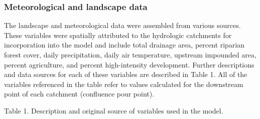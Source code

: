 \documentclass[]{article}
\begin{document}
\subsubsection{Meteorological and landscape
data}\label{meteorological-and-landscape-data}

The landscape and meteorological data were assembled from various
sources. These variables were spatially attributed to the hydrologic
catchments for incorporation into the model and include total drainage
area, percent riparian forest cover, daily precipitation, daily air
temperature, upstream impounded area, percent agriculture, and percent
high-intensity development. Further descriptions and data sources for
each of these variables are described in Table 1. All of the variables
referenced in the table refer to values calculated for the downstream
point of each catchment (confluence pour point).

Table 1. Description and original source of variables used in the model.
\end{document}
